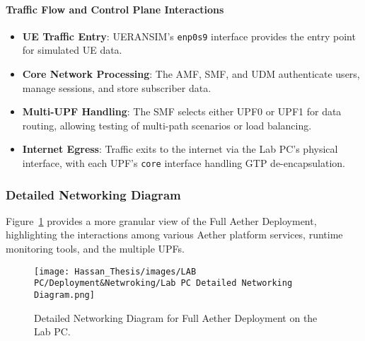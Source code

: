\paragraph{Traffic Flow and Control Plane Interactions}
\begin{itemize}
    \item \textbf{UE Traffic Entry}: UERANSIM’s \texttt{enp0s9} interface provides the entry point for simulated UE data.
    \item \textbf{Core Network Processing}: The AMF, SMF, and UDM authenticate users, manage sessions, and store subscriber data.
    \item \textbf{Multi-UPF Handling}: The SMF selects either UPF0 or UPF1 for data routing, allowing testing of multi-path scenarios or load balancing.
    \item \textbf{Internet Egress}: Traffic exits to the internet via the Lab PC’s physical interface, with each UPF’s \texttt{core} interface handling GTP de-encapsulation.
\end{itemize}

\subsubsection{Detailed Networking Diagram}
\label{subsubsec:labpc-detailed-network}

Figure~\ref{fig:lab-pc-detailed-networking} provides a more granular view of the Full Aether Deployment, highlighting the interactions among various Aether platform services, runtime monitoring tools, and the multiple UPFs.

\begin{figure}[H] %
    \centering
    \texttt{[image: Hassan\_Thesis/images/LAB PC/Deployment\&Netwroking/Lab PC Detailed Networking Diagram.png]}
    \caption{Detailed Networking Diagram for Full Aether Deployment on the Lab PC.}
    \label{fig:lab-pc-detailed-networking}
\end{figure}


